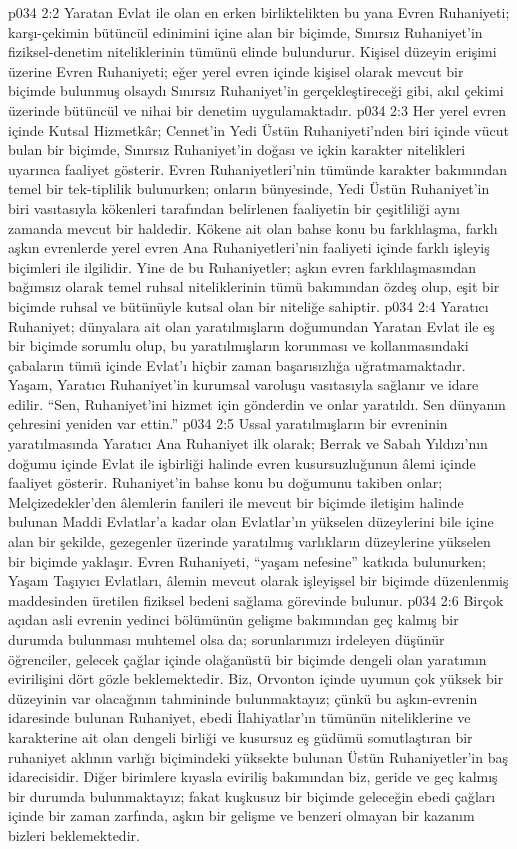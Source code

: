 \vs p034 2:2 Yaratan Evlat ile olan en erken birliktelikten bu yana Evren Ruhaniyeti; karşı\hyp{}çekimin bütüncül edinimini içine alan bir biçimde, Sınırsız Ruhaniyet’in fiziksel\hyp{}denetim niteliklerinin tümünü elinde bulundurur. Kişisel düzeyin erişimi üzerine Evren Ruhaniyeti; eğer yerel evren içinde kişisel olarak mevcut bir biçimde bulunmuş olsaydı Sınırsız Ruhaniyet’in gerçekleştireceği gibi, akıl çekimi üzerinde bütüncül ve nihai bir denetim uygulamaktadır.
\vs p034 2:3 Her yerel evren içinde Kutsal Hizmetkâr; Cennet’in Yedi Üstün Ruhaniyeti’nden biri içinde vücut bulan bir biçimde, Sınırsız Ruhaniyet’in doğası ve içkin karakter nitelikleri uyarınca faaliyet gösterir. Evren Ruhaniyetleri’nin tümünde karakter bakımından temel bir tek\hyp{}tiplilik bulunurken; onların bünyesinde, Yedi Üstün Ruhaniyet’in biri vasıtasıyla kökenleri tarafından belirlenen faaliyetin bir çeşitliliği aynı zamanda mevcut bir haldedir. Kökene ait olan bahse konu bu farklılaşma, farklı aşkın evrenlerde yerel evren Ana Ruhaniyetleri’nin faaliyeti içinde farklı işleyiş biçimleri ile ilgilidir. Yine de bu Ruhaniyetler; aşkın evren farklılaşmasından bağımsız olarak temel ruhsal niteliklerinin tümü bakımından özdeş olup, eşit bir biçimde ruhsal ve bütünüyle kutsal olan bir niteliğe sahiptir.
\vs p034 2:4 Yaratıcı Ruhaniyet; dünyalara ait olan yaratılmışların doğumundan Yaratan Evlat ile eş bir biçimde sorumlu olup, bu yaratılmışların korunması ve kollanmasındaki çabaların tümü içinde Evlat’ı hiçbir zaman başarısızlığa uğratmamaktadır. Yaşam, Yaratıcı Ruhaniyet’in kurumsal varoluşu vasıtasıyla sağlanır ve idare edilir. “Sen, Ruhaniyet’ini hizmet için gönderdin ve onlar yaratıldı. Sen dünyanın çehresini yeniden var ettin.”
\vs p034 2:5 Ussal yaratılmışların bir evreninin yaratılmasında Yaratıcı Ana Ruhaniyet ilk olarak; Berrak ve Sabah Yıldızı’nın doğumu içinde Evlat ile işbirliği halinde evren kusursuzluğunun âlemi içinde faaliyet gösterir. Ruhaniyet’in bahse konu bu doğumunu takiben onlar; Melçizedekler’den âlemlerin fanileri ile mevcut bir biçimde iletişim halinde bulunan Maddi Evlatlar’a kadar olan Evlatlar’ın yükselen düzeylerini bile içine alan bir şekilde, gezegenler üzerinde yaratılmış varlıkların düzeylerine yükselen bir biçimde yaklaşır. Evren Ruhaniyeti, “yaşam nefesine” katkıda bulunurken; Yaşam Taşıyıcı Evlatları, âlemin mevcut olarak işleyişsel bir biçimde düzenlenmiş maddesinden üretilen fiziksel bedeni sağlama görevinde bulunur.
\vs p034 2:6 Birçok açıdan asli evrenin yedinci bölümünün gelişme bakımından geç kalmış bir durumda bulunması muhtemel olsa da; sorunlarımızı irdeleyen düşünür öğrenciler, gelecek çağlar içinde olağanüstü bir biçimde dengeli olan yaratımın evirilişini dört gözle beklemektedir. Biz, Orvonton içinde uyumun çok yüksek bir düzeyinin var olacağının tahmininde bulunmaktayız; çünkü bu aşkın\hyp{}evrenin idaresinde bulunan Ruhaniyet, ebedi İlahiyatlar’ın tümünün niteliklerine ve karakterine ait olan dengeli birliği ve kusursuz eş güdümü somutlaştıran bir ruhaniyet aklının varlığı biçimindeki yüksekte bulunan Üstün Ruhaniyetler’in baş idarecisidir. Diğer birimlere kıyasla eviriliş bakımından biz, geride ve geç kalmış bir durumda bulunmaktayız; fakat kuşkusuz bir biçimde geleceğin ebedi çağları içinde bir zaman zarfında, aşkın bir gelişme ve benzeri olmayan bir kazanım bizleri beklemektedir.
